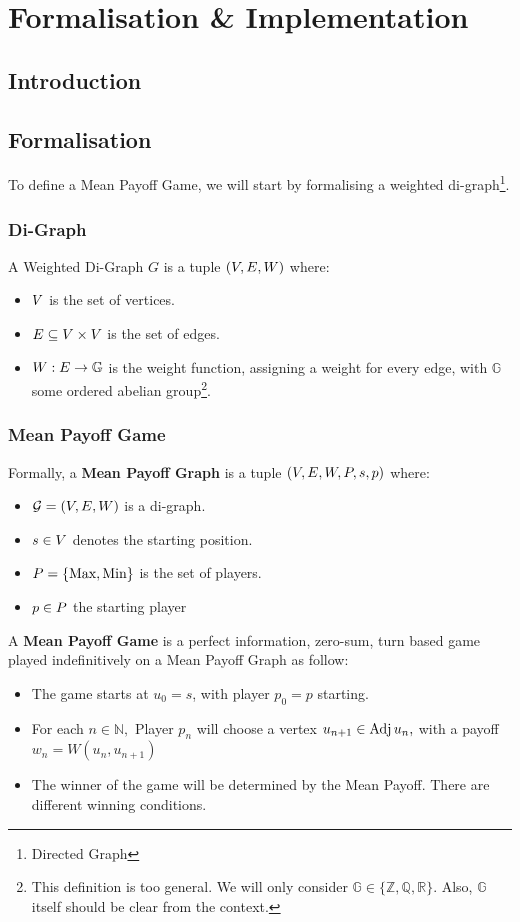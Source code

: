 \chapter{Formalisation \& Implementation}
\section{Introduction}

\section{Formalisation}
To define a Mean Payoff Game, we will start by formalising a weighted di-graph\footnote{Directed Graph}.

\subsection{Di-Graph}
A Weighted Di-Graph $G$ is a tuple $(V,E,W)$ where:

\begin{itemize}
		\item $V$ is the set of vertices.
		\item $E \subseteq V\times V$ is the set of edges.
		\item $W:E\rightarrow \mathbb{G}$ is the weight function, assigning a weight for every edge, with $\mathbb{G}$ some ordered abelian group\footnote{This definition is too general. We will only consider $\mathbb{G}\in \{\mathbb{Z},\mathbb{Q},\mathbb{R}\}.$ Also, $\mathbb{G}$ itself should be clear from the context.}. 
\end{itemize}
\subsection{Mean Payoff Game}
Formally, a \textbf{Mean Payoff Graph} is a tuple $(V,E,W,P,s,p)$ where:
\begin{itemize}
	\item $\mathcal{G}=(V,E,W)$ is a di-graph.
		\item $s\in V$ denotes the starting position.
	\item $P=\{\text{Max},\text{Min}\}$ is the set of players.
	\item $p\in P$ the starting player
\end{itemize}


A  \textbf{Mean Payoff Game} is a perfect information, zero-sum, turn based game played indefinitively on a Mean Payoff Graph as follow:
\begin{itemize}
\item The game starts at $u_0=s$, with player $p_0=p$ starting.
\item For each $n\in\mathbb{N},$ Player $p_n$ will choose a vertex $u_{n+1}\in \operatorname{Adj} u_n,$ with a payoff $w_n=W(u_n,u_{n+1})$
\item The winner of the game will be determined by the Mean Payoff. There are different winning conditions.
\end{itemize}

